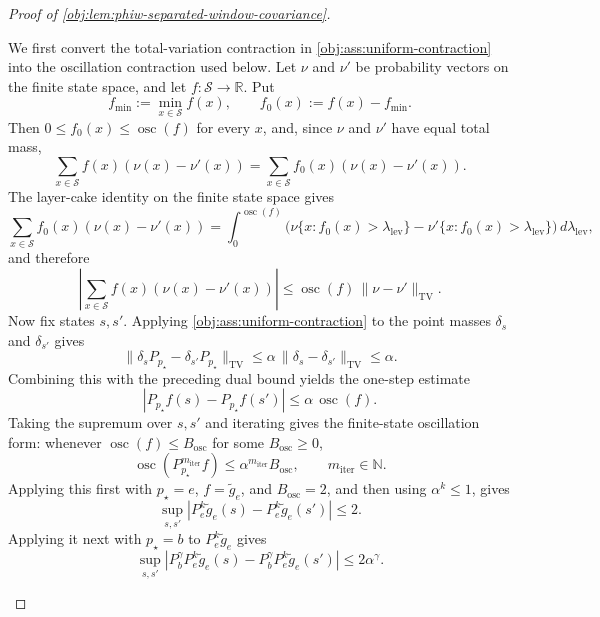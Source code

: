 \begin{proof}[Proof of \cref{obj:lem:phiw-separated-window-covariance}]
\begin{enumerate}
We first convert the total-variation contraction in \cref{obj:ass:uniform-contraction} into the oscillation contraction used below. Let \(\nu\) and \(\nu'\) be probability vectors on the finite state space, and let \(f:\mathcal S\to\mathbb R\). Put
\[
f_{\min}:=\min_{x\in\mathcal S} f(x),
\qquad
f_0(x):=f(x)-f_{\min}.
\]
Then \(0\le f_0(x)\le \operatorname{osc}(f)\) for every \(x\), and, since \(\nu\) and \(\nu'\) have equal total mass,
\[
\sum_{x\in\mathcal S} f(x)(\nu(x)-\nu'(x))
=
\sum_{x\in\mathcal S} f_0(x)(\nu(x)-\nu'(x)).
\]
The layer-cake identity on the finite state space gives
\[
\sum_{x\in\mathcal S} f_0(x)(\nu(x)-\nu'(x))
=
\int_{0}^{\operatorname{osc}(f)}
\bigl(\nu\{x:f_0(x)>\lambda_{\mathrm{lev}}\}
      -\nu'\{x:f_0(x)>\lambda_{\mathrm{lev}}\}\bigr)
\,d\lambda_{\mathrm{lev}},
\]
and therefore
\[
\left|
\sum_{x\in\mathcal S} f(x)(\nu(x)-\nu'(x))
\right|
\le
\operatorname{osc}(f)\,\|\nu-\nu'\|_{\mathrm{TV}}.
\]
Now fix states \(s,s'\). Applying \cref{obj:ass:uniform-contraction} to the point masses \(\delta_s\) and \(\delta_{s'}\) gives
\[
\|\delta_s P_{p_\star}-\delta_{s'}P_{p_\star}\|_{\mathrm{TV}}
\le
\alpha\,\|\delta_s-\delta_{s'}\|_{\mathrm{TV}}
\le \alpha .
\]
Combining this with the preceding dual bound yields the one-step estimate
\[
|P_{p_\star}f(s)-P_{p_\star}f(s')|
\le
\alpha\,\operatorname{osc}(f).
\]
Taking the supremum over \(s,s'\) and iterating gives the finite-state oscillation form: whenever \(\operatorname{osc}(f)\le B_{\mathrm{osc}}\) for some \(B_{\mathrm{osc}}\ge0\),
\[
\operatorname{osc}(P_{p_\star}^{m_{\mathrm{iter}}}f)
\le
\alpha^{m_{\mathrm{iter}}}B_{\mathrm{osc}},
\qquad m_{\mathrm{iter}}\in\mathbb N.
\]
Applying this first with \(p_\star=e\), \(f=\widetilde g_e\), and \(B_{\mathrm{osc}}=2\), and then using \(\alpha^k\le1\), gives
\[
\sup_{s,s'}|P_e^k\widetilde g_e(s)-P_e^k\widetilde g_e(s')|\le 2.
\]
Applying it next with \(p_\star=b\) to \(P_e^k\widetilde g_e\) gives
\[
\sup_{s,s'}
\left|
P_b^\gamma P_e^k\widetilde g_e(s)
-
P_b^\gamma P_e^k\widetilde g_e(s')
\right|
\le
2\alpha^\gamma .
\] %


\end{enumerate}
\end{proof}
